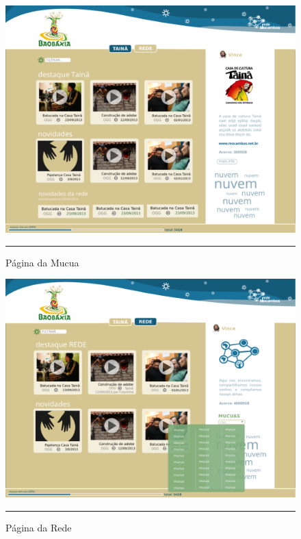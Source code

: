 \begin{itemize}
\begin{figure}[htbp]
  \centering
  \includegraphics[width=\textwidth]{./Fig/layout-pgMUCUA.pdf}
  \rule{35em}{0.5pt}
  \caption[Página da Mucua]{Página da Mucua}
  \label{fig:layout-pgMUCUA}
\end{figure}

\begin{figure}[htbp]
  \centering
  \includegraphics[width=\textwidth]{./Fig/layout-pgREDE.pdf}
  \rule{35em}{0.5pt}
  \caption[Página da Rede]{Página da Rede}
  \label{fig:layout-pgREDE}
\end{figure}


\end{itemize}
